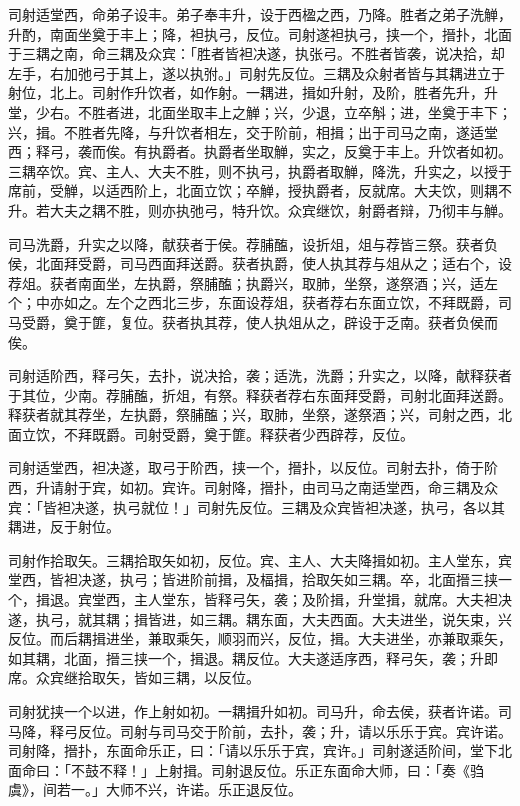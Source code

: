 \documentclass[]{article}
\begin{document}
司射适堂西，命弟子设丰。弟子奉丰升，设于西楹之西，乃降。胜者之弟子洗觯，升酌，南面坐奠于丰上；降，袒执弓，反位。司射遂袒执弓，挟一个，搢扑，北面于三耦之南，命三耦及众宾：「胜者皆袒决遂，执张弓。不胜者皆袭，说决拾，却左手，右加弛弓于其上，遂以执弣。」司射先反位。三耦及众射者皆与其耦进立于射位，北上。司射作升饮者，如作射。一耦进，揖如升射，及阶，胜者先升，升堂，少右。不胜者进，北面坐取丰上之觯；兴，少退，立卒斛；进，坐奠于丰下；兴，揖。不胜者先降，与升饮者相左，交于阶前，相揖；出于司马之南，遂适堂西；释弓，袭而俟。有执爵者。执爵者坐取觯，实之，反奠于丰上。升饮者如初。三耦卒饮。宾、主人、大夫不胜，则不执弓，执爵者取觯，降洗，升实之，以授于席前，受觯，以适西阶上，北面立饮；卒觯，授执爵者，反就席。大夫饮，则耦不升。若大夫之耦不胜，则亦执弛弓，特升饮。众宾继饮，射爵者辩，乃彻丰与觯。

司马洗爵，升实之以降，献获者于侯。荐脯醢，设折俎，俎与荐皆三祭。获者负侯，北面拜受爵，司马西面拜送爵。获者执爵，使人执其荐与俎从之；适右个，设荐俎。获者南面坐，左执爵，祭脯醢；执爵兴，取肺，坐祭，遂祭酒；兴，适左个；中亦如之。左个之西北三步，东面设荐俎，获者荐右东面立饮，不拜既爵，司马受爵，奠于篚，复位。获者执其荐，使人执俎从之，辟设于乏南。获者负侯而俟。

司射适阶西，释弓矢，去扑，说决拾，袭；适洗，洗爵；升实之，以降，献释获者于其位，少南。荐脯醢，折俎，有祭。释获者荐右东面拜受爵，司射北面拜送爵。释获者就其荐坐，左执爵，祭脯醢；兴，取肺，坐祭，遂祭酒；兴，司射之西，北面立饮，不拜既爵。司射受爵，奠于篚。释获者少西辟荐，反位。

司射适堂西，袒决遂，取弓于阶西，挟一个，搢扑，以反位。司射去扑，倚于阶西，升请射于宾，如初。宾许。司射降，搢扑，由司马之南适堂西，命三耦及众宾：「皆袒决遂，执弓就位！」司射先反位。三耦及众宾皆袒决遂，执弓，各以其耦进，反于射位。

司射作拾取矢。三耦拾取矢如初，反位。宾、主人、大夫降揖如初。主人堂东，宾堂西，皆袒决遂，执弓；皆进阶前揖，及楅揖，拾取矢如三耦。卒，北面搢三挟一个，揖退。宾堂西，主人堂东，皆释弓矢，袭；及阶揖，升堂揖，就席。大夫袒决遂，执弓，就其耦；揖皆进，如三耦。耦东面，大夫西面。大夫进坐，说矢束，兴反位。而后耦揖进坐，兼取乘矢，顺羽而兴，反位，揖。大夫进坐，亦兼取乘矢，如其耦，北面，搢三挟一个，揖退。耦反位。大夫遂适序西，释弓矢，袭；升即席。众宾继拾取矢，皆如三耦，以反位。

司射犹挟一个以进，作上射如初。一耦揖升如初。司马升，命去侯，获者许诺。司马降，释弓反位。司射与司马交于阶前，去扑，袭；升，请以乐乐于宾。宾许诺。司射降，搢扑，东面命乐正，曰：「请以乐乐于宾，宾许。」司射遂适阶间，堂下北面命曰：「不鼓不释！」上射揖。司射退反位。乐正东面命大师，曰：「奏《驺虞》，间若一。」大师不兴，许诺。乐正退反位。
\end{document}
